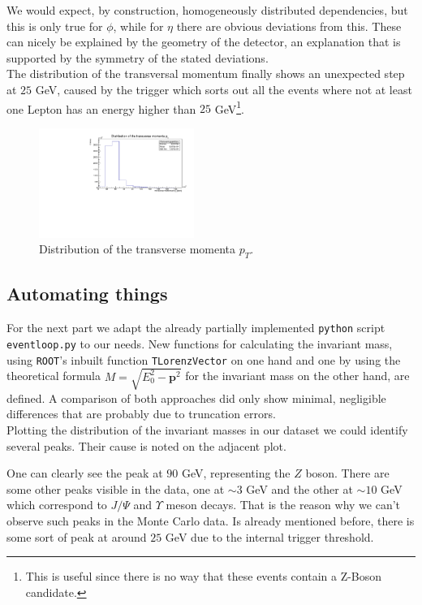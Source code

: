 \documentclass[twocolumn,
			   showpacs,%
               nofootinbib,
               aps,%
               prd,
               notitlepage,
               showkeys,
               10pt]{revtex4-1}
\begin{document}
We would expect, by construction, homogeneously distributed dependencies, but this is only true for $\phi$, while for $\eta$ there are obvious deviations from this.
These can nicely be explained by the geometry of the detector, an explanation that is supported by the symmetry of the stated deviations.\\

The distribution of the transversal momentum finally shows an unexpected step at $25$ GeV, caused by the trigger which sorts out all the events where not at least one Lepton has an energy higher than $25$ GeV\footnote{This is useful since there is no way that these events contain a Z-Boson candidate.}.
\begin{figure}[H]
	\centering
	\includegraphics[width=0.45\textwidth]{figures/plots/TransverseMomentum}
	\caption{Distribution of the transverse momenta $p_T$.}
\end{figure}

\subsection{Automating things}
For the next part we adapt the already partially implemented \verb|python| script \verb|eventloop.py| to our needs. New functions for calculating the invariant mass, using \verb|ROOT|'s inbuilt function \verb|TLorenzVector| on one hand and one by using the theoretical formula $M = \sqrt{E_0^2 - \mathbf{p}^2}$ for the invariant mass on the other hand, are defined. A comparison of both approaches did only show minimal, negligible differences that are probably due to truncation errors.\\

Plotting the distribution of the invariant masses in our dataset we could identify several peaks. Their cause is noted on the adjacent plot.

One can clearly see the peak at $90$ GeV, representing the $Z$ boson. There are some other peaks visible in the data, one at $\sim 3$ GeV and the other at $\sim 10$ GeV which correspond to $J/\Psi$ and $\Upsilon$ meson decays. That is the reason why we can't observe such peaks in the Monte Carlo data. Is already mentioned before, there is some sort of peak at around $25$ GeV due to the internal trigger threshold.
\end{document}
